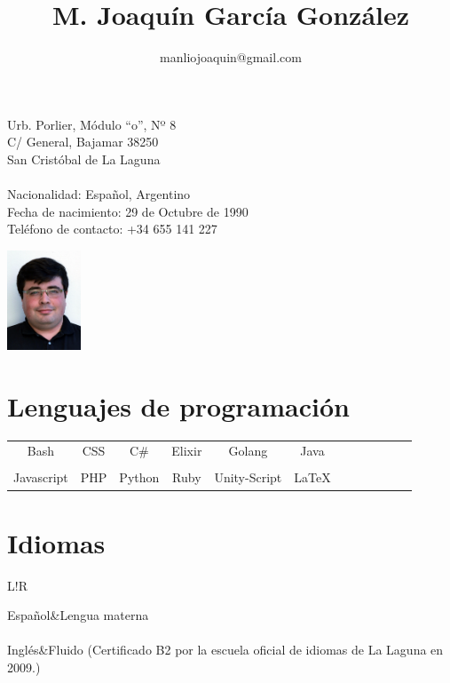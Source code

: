 \documentclass[10pt]{article}
\title{\bfseries M. Joaquín García González}
\author{manliojoaquin@gmail.com}
\date{}
\newcommand\VRule{\color{lightgray}\vrule width 0.5pt}
\begin{document}

    \maketitle

    \begin{minipage}[ht]{0.48\textwidth}
        Urb. Porlier, Módulo ``o'', Nº 8\\
        C/ General, Bajamar 38250\\
        San Cristóbal de La Laguna\\
        \\
        Nacionalidad: Español, Argentino\\
        Fecha de nacimiento: 29 de Octubre de 1990\\
        Teléfono de contacto: +34 655 141 227
    \end{minipage}
    \begin{minipage}[ht]{0.48\textwidth}
        \begin{flushright}
        \includegraphics[height=8em]{profile}
        \end{flushright}
    \end{minipage}

    \section*{Lenguajes de programación}
    \begin{center}
    \begin{tabular}{ c c c c c c c c c c c c }

        Bash & CSS & C\# & Elixir & Golang & Java \\\\

        Javascript & PHP & Python & Ruby & Unity-Script & \LaTeX

    \end{tabular}
    \end{center}

    \section*{Idiomas}
    \begin{tabular}{L!{\VRule}R}

        Español&Lengua materna\\\\

        Inglés&Fluido (Certificado B2 por la escuela oficial de idiomas de La Laguna en 2009.)\\\\

    \end{tabular}
\end{document}
